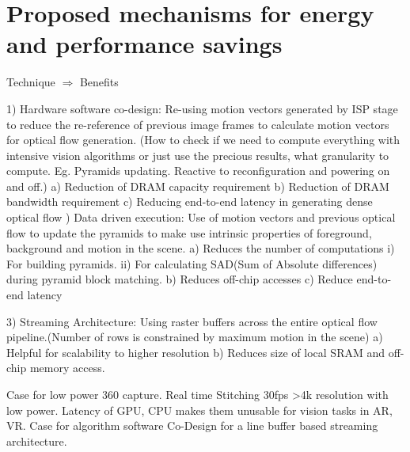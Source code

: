 \chapter{Proposed mechanisms for energy and performance savings}

	Technique $\Rightarrow$ Benefits  \newline

1) Hardware software co-design: Re-using motion vectors generated by ISP stage to reduce the re-reference of previous image frames to calculate motion vectors for optical flow generation.
(How to check if we need to compute everything with intensive vision algorithms or just use the precious results, what granularity to compute. Eg. Pyramids updating. Reactive to reconfiguration and powering on and off.)
	a) Reduction of DRAM capacity requirement
	b) Reduction of DRAM bandwidth requirement
	c) Reducing end-to-end latency in generating dense optical flow
) Data driven execution: Use of motion vectors and previous optical flow to update the pyramids to make use intrinsic properties of foreground, background and motion in the scene.
	a) Reduces the number of computations 
		i) For building pyramids.
		ii) For calculating SAD(Sum of Absolute differences) during pyramid block matching.
	b) Reduces off-chip accesses
	c) Reduce end-to-end latency
\newline

3) Streaming Architecture: Using raster buffers across the entire optical flow pipeline.(Number of rows is constrained by maximum motion in the scene)
a) Helpful for scalability to higher resolution
b) Reduces size of local SRAM and off-chip memory access.
\newline

Case for low power 360 capture. Real time Stitching 30fps >4k resolution with low power. 
Latency of GPU, CPU makes them unusable for vision tasks in AR, VR.
Case for algorithm software Co-Design for a line buffer based streaming architecture. \newline


